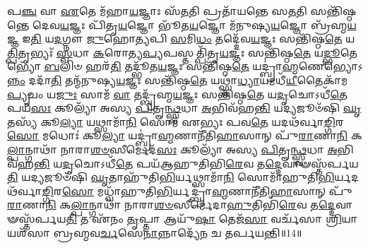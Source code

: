 𑌪\-\ul{𑌞𑍍𑌚} 𑌵𑌾 \ul{𑌏}\-𑌤𑍇 𑌮᳴𑌹𑌾\-\ul{𑌯}\-𑌜𑍍𑌞𑌾𑌃 𑌸᳴\-\ul{𑌤}\-𑌤𑌿 𑌪𑍍𑌰𑌤𑌾᳴𑌯𑌨𑍍𑌤𑍇 𑌸\-\ul{𑌤}\-𑌤𑌿 𑌸𑌨𑍍𑌤𑌿᳴𑌷𑍍𑌠𑌨𑍍𑌤𑍇 𑌦𑍇𑌵\-\ul{𑌯}\-𑌜𑍍𑌞𑌃 𑌪𑌿᳴𑌤𑍃\-\ul{𑌯}\-𑌜𑍍𑌞𑍋 𑌭𑍂᳴𑌤\-\ul{𑌯}\-𑌜𑍍𑌞𑍋 𑌮᳴𑌨𑍁𑌷𑍍𑌯\-\ul{𑌯}\-𑌜𑍍𑌞𑍋 𑌬𑍍𑌰᳴𑌹𑍍𑌮\-\ul{𑌯}\-𑌜𑍍𑌞 𑌇\-\ul{𑌤𑌿} 𑌯\-\ul{𑌦}\-𑌗𑍍𑌨𑍗 \ul{𑌜𑍁}\-𑌹𑍋\-\ul{𑌤𑍍𑌯}\-𑌪𑌿 \ul{𑌸}\-𑌮𑌿\-\ul{𑌧𑌂} 𑌤𑌦𑍍𑌦𑍇᳴𑌵\-\ul{𑌯}\-𑌜𑍍𑌞𑌃 𑌸𑌨𑍍𑌤𑌿᳴𑌷𑍍𑌠\-\ul{𑌤𑍇} 𑌯\-\ul{𑌤𑍍𑌪𑌿}\-𑌤𑍃𑌭𑍍𑌯𑌃᳴ \ul{𑌸𑍍𑌵}\-𑌧𑌾 \ul{𑌕}\-𑌰𑍋𑌤𑍍𑌯\-\ul{𑌪𑍍𑌯}\-𑌪𑌸𑍍𑌤𑌤𑍍𑌪𑌿᳴𑌤𑍃\-\ul{𑌯}\-𑌜𑍍𑌞𑌃 𑌸𑌨𑍍𑌤𑌿᳴𑌷𑍍𑌠\-\ul{𑌤𑍇} 𑌯\-\ul{𑌦𑍍𑌭𑍂}\-𑌤𑍇𑌭𑍍𑌯𑍋᳴ \ul{𑌬}\-𑌲𑌿𑍞 𑌹𑌰᳴\-\ul{𑌤𑌿} 𑌤𑌦𑍍𑌭𑍂᳴𑌤\-\ul{𑌯}\-𑌜𑍍𑌞𑌃 𑌸𑌨𑍍𑌤𑌿᳴𑌷𑍍𑌠\-\ul{𑌤𑍇} 𑌯𑌦𑍍𑌬𑍍𑌰𑌾॑\-\ul{𑌹𑍍𑌮}\-𑌣𑍇𑌭𑍍𑌯𑍋𑌽\-\ul{𑌨𑍍𑌨𑌂} 𑌦𑌦𑌾᳴\-\ul{𑌤𑌿} 𑌤𑌨𑍍𑌮᳴𑌨𑍁𑌷𑍍𑌯\-\ul{𑌯}\-𑌜𑍍𑌞𑌃 𑌸𑌨𑍍𑌤𑌿᳴𑌷𑍍𑌠\-\ul{𑌤𑍇} 𑌯𑌥𑍍𑌸𑍍𑌵𑌾॑\-\ul{𑌧𑍍𑌯𑌾}\-𑌯𑌮𑌧𑍀᳴\-\ul{𑌯𑍀}\-𑌤𑍈𑌕𑌾᳴𑌮\-\ul{𑌪𑍍𑌯𑍃}\-𑌚𑌂 𑌯\-\ul{𑌜𑍁𑌃} 𑌸𑌾𑌮᳴ \ul{𑌵𑌾} 𑌤𑌦𑍍𑌬𑍍𑌰᳴𑌹𑍍𑌮\-\ul{𑌯}\-𑌜𑍍𑌞𑌃 𑌸𑌨𑍍𑌤𑌿᳴𑌷𑍍𑌠\-\ul{𑌤𑍇} 𑌯\-\ul{𑌦𑍃}\-𑌚𑍋𑌽𑌧𑍀᳴\-\ul{𑌤𑍇} 𑌪𑌯᳴\-\ul{𑌸𑌃} 𑌕𑍂𑌲𑍍𑌯𑌾᳴ 𑌅𑌸𑍍𑌯 \ul{𑌪𑌿}\-𑌤𑍄\-\ul{𑌨𑍍𑌥𑍍𑌸𑍍𑌵}\-𑌧𑌾 \ul{𑌅}\-𑌭𑌿𑌵᳴𑌹\-\ul{𑌨𑍍𑌤𑌿} 𑌯𑌦𑍍𑌯𑌜𑍂𑍞᳴𑌷𑌿 \ul{𑌘𑍃}\-𑌤𑌸𑍍𑌯᳴ 𑌕𑍂\-\ul{𑌲𑍍𑌯𑌾} 𑌯𑌥𑍍𑌸𑌾𑌮𑌾᳴\-\ul{𑌨𑌿} 𑌸𑍋𑌮᳴ 𑌏𑌭𑍍𑌯𑌃 𑌪𑌵\-\ul{𑌤𑍇} 𑌯𑌦𑌥᳴𑌰𑍍𑌵𑌾\-\ul{𑌙𑍍𑌗𑌿}\-𑌰\-\ul{𑌸𑍋} 𑌮𑌧𑍋𑌃॑ 𑌕𑍂\-\ul{𑌲𑍍𑌯𑌾} 𑌯𑌦𑍍𑌬𑍍𑌰𑌾॑\-\ul{𑌹𑍍𑌮}\-𑌣𑌾𑌨𑍀᳴𑌤𑌿\-\ul{𑌹𑌾}\-𑌸𑌾𑌨𑍍 𑌪𑍁᳴\-\ul{𑌰𑌾}\-𑌣𑌾\-\ul{𑌨𑌿} 𑌕\-\ul{𑌲𑍍𑌪𑌾}\-𑌨𑍍𑌗𑌾𑌥𑌾᳴ 𑌨𑌾𑌰𑌾\-\ul{𑌶}\-\-\ul{𑍞}\-𑌸𑍀𑌰𑍍𑌮𑍇𑌦᳴\-\ul{𑌸𑌃} 𑌕𑍂𑌲𑍍𑌯𑌾᳴ 𑌅𑌸𑍍𑌯 \ul{𑌪𑌿}\-𑌤𑍄\-\ul{𑌨𑍍𑌥𑍍𑌸𑍍𑌵}\-𑌧𑌾 \ul{𑌅}\-𑌭𑌿𑌵᳴𑌹\-\ul{𑌨𑍍𑌤𑌿} 𑌯\-\ul{𑌦𑍃}\-𑌚𑍋𑌽𑌧𑍀᳴\-\ul{𑌤𑍇} 𑌪𑌯᳴𑌆𑌹𑍁𑌤𑌿𑌭𑌿\-\ul{𑌰𑍇}\-𑌵 𑌤\-\ul{𑌦𑍍𑌦𑍇}\-𑌵𑌾𑍟𑌸𑍍𑌤᳴𑌰𑍍𑌪𑌯\-\ul{𑌤𑌿} 𑌯𑌦𑍍𑌯𑌜𑍂𑍞᳴𑌷𑌿 \ul{𑌘𑍃}\-𑌤𑌾𑌹𑍁᳴𑌤𑌿\-\ul{𑌭𑌿}\-𑌰𑍍𑌯𑌥𑍍𑌸𑌾𑌮𑌾᳴\-\ul{𑌨𑌿} 𑌸𑍋𑌮𑌾᳴𑌹𑍁𑌤𑌿\-\ul{𑌭𑌿}\-𑌰𑍍𑌯𑌦𑌥᳴𑌰𑍍𑌵𑌾\-\ul{𑌙𑍍𑌗𑌿}\-𑌰\-\ul{𑌸𑍋} 𑌮𑌧𑍍𑌵𑌾᳴\-𑌹𑍁𑌤𑌿\-\ul{𑌭𑌿}\-𑌰𑍍𑌯𑌦𑍍𑌬𑍍𑌰𑌾॑\-\ul{𑌹𑍍𑌮}\-𑌣𑌾𑌨𑍀᳴𑌤𑌿\-\ul{𑌹𑌾}\-𑌸𑌾𑌨𑍍 𑌪𑍁᳴\-\ul{𑌰𑌾}\-𑌣𑌾\-\ul{𑌨𑌿} 𑌕\-\ul{𑌲𑍍𑌪𑌾}\-𑌨𑍍𑌗𑌾𑌥𑌾᳴ 𑌨𑌾𑌰𑌾\-\ul{𑌶}\-\-\ul{𑍞}\-𑌸𑍀𑌰𑍍𑌮𑍇᳴𑌦𑌾\-\ul{𑌹𑍁}\-𑌤𑌿𑌭𑌿᳴\-\ul{𑌰𑍇}\-𑌵 𑌤\-\ul{𑌦𑍍𑌦𑍇}\-𑌵𑌾𑍟𑌸𑍍𑌤᳴𑌰𑍍𑌪𑌯\-\ul{𑌤𑌿} 𑌤 𑌏᳴𑌨𑌂 \ul{𑌤𑍃}\-𑌪𑍍𑌤𑌾 𑌆𑌯𑍁᳴\-\ul{𑌷𑌾} 𑌤𑍇𑌜᳴\-\ul{𑌸𑌾} 𑌵𑌰𑍍𑌚᳴𑌸𑌾 \ul{𑌶𑍍𑌰𑌿}\-𑌯𑌾 𑌯𑌶᳴𑌸𑌾 𑌬𑍍𑌰𑌹𑍍𑌮𑌵\-\ul{𑌰𑍍𑌚}\-𑌸𑍇\-\ul{𑌨𑌾}\-𑌨𑍍𑌨𑌾𑌦𑍍𑌯𑍇᳴𑌨 𑌚 𑌤𑌰𑍍𑌪𑌯𑌨𑍍𑌤𑌿॥14॥
\anuvakamend


